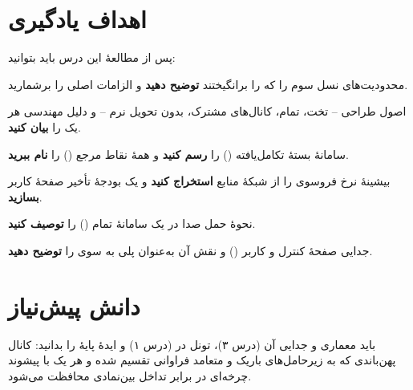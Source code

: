 \documentclass[11pt,a4paper]{article}
\begin{document}
\ACNcover

\section{اهداف یادگیری}
پس از مطالعهٔ این درس باید بتوانید:
\begin{objectives}
  \item محدودیت‌های نسل سوم را که  را برانگیختند \textbf{توضیح دهید} و الزامات اصلی
         را برشمارید.
  \item اصول طراحی  -- تخت، تمام‌، کانال‌های مشترک، بدون تحویل نرم -- و دلیل
        مهندسی هر یک را \textbf{بیان کنید}.
  \item سامانهٔ بستهٔ تکامل‌یافته () را \textbf{رسم کنید} و همهٔ نقاط مرجع
        () را \textbf{نام ببرید}.
  \item بیشینهٔ نرخ فروسوی  را از شبکهٔ منابع \textbf{استخراج کنید} و یک بودجهٔ تأخیر صفحهٔ
        کاربر \textbf{بسازید}.
  \item نحوهٔ حمل صدا در یک سامانهٔ تمام‌ () را
        \textbf{توصیف کنید}.
  \item جدایی صفحهٔ کنترل و کاربر () و نقش آن به‌عنوان پلی به سوی  را \textbf{توضیح دهید}.
\end{objectives}

\section{دانش پیش‌نیاز}
باید معماری  و جدایی  آن (درس ۳)، تونل  در  (درس ۱) و ایدهٔ
پایهٔ  را بدانید: کانال پهن‌باندی که به زیرحامل‌های باریک و متعامد فراوانی تقسیم شده و هر
یک با پیشوند چرخه‌ای در برابر تداخل بین‌نمادی محافظت می‌شود.
\end{document}
